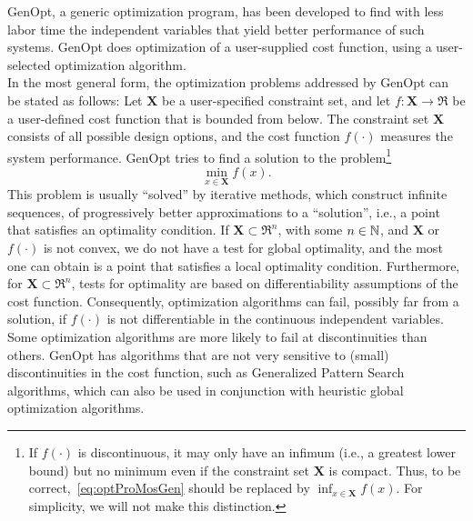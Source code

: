 GenOpt, a generic optimization program, has been developed
to find with less labor time the independent variables that 
yield better performance of such systems. 
GenOpt does optimization of a user-supplied cost function,
using a user-selected optimization algorithm.\\

In the most general form, the optimization problems addressed by GenOpt
can be stated as follows:
Let $\mathbf X$ be a user-specified constraint set, and 
let $f \colon \mathbf X \to \Re$ be a user-defined cost function
that is bounded from below.
The constraint set $\mathbf X$ consists of all possible design options,
and the cost function $f(\cdot)$ measures the system performance.
GenOpt tries to find a solution to the problem\footnote{
If $f(\cdot)$ is discontinuous, it may only have an infimum 
(i.e., a greatest lower bound) but no minimum even if the constraint set
$\mathbf X$ is compact.
Thus, to be correct,~\eqref{eq:optProMosGen}
should be replaced by $\inf_{x \in \mathbf X} f(x)$. 
For simplicity, we will not make this distinction.}
\begin{equation}
  \min_{x \in \mathbf X} f(x).
\label{eq:optProMosGen}
\end{equation}
This problem is usually ``solved'' by iterative methods,
which construct infinite sequences, of progressively better approximations
to a ``solution'', i.e., a point that satisfies an optimality condition.
If $\mathbf X \subset \Re^n$, with some $n \in {\mathbb N}$,
and $\mathbf X$ or $f(\cdot)$ is not convex, 
we do not have a test for global optimality,
and the most one can obtain is a point that satisfies a local optimality condition.
Furthermore, for $\mathbf X \subset \Re^n$, tests for optimality are based on 
differentiability assumptions of the cost function.
Consequently,
optimization algorithms can fail, possibly far from a solution,
if $f(\cdot)$ is not differentiable in the continuous independent variables.
Some optimization algorithms are more likely to fail at discontinuities than others.
GenOpt has algorithms that are not very sensitive to (small) discontinuities
in the cost function, such as Generalized Pattern Search algorithms,
which can also be used in conjunction with heuristic global optimization algorithms.\\

